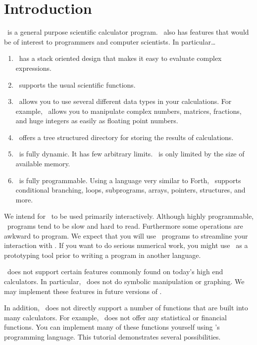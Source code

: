 
\chapter{Introduction}

\CLAC\ is a general purpose scientific calculator program. \CLAC\ also has features that would
be of interest to programmers and computer scientists. In particular\ldots

\begin{enumerate}
  
\item \CLAC\ has a stack oriented design that makes it easy to evaluate complex expressions.
  
\item \CLAC\ supports the usual scientific functions.
  
\item \CLAC\ allows you to use several different data types in your calculations. For example,
  \CLAC\ allows you to manipulate complex numbers, matrices, fractions, and huge integers as
  easily as floating point numbers.
  
\item \CLAC\ offers a tree structured directory for storing the results of calculations.
  
\item \CLAC\ is fully dynamic. It has few arbitrary limits. \CLAC\ is only limited by the size
  of available memory.
  
\item \CLAC\ is fully programmable. Using a language very similar to Forth, \CLAC\ supports
  conditional branching, loops, subprograms, arrays, pointers, structures, and more.

\end{enumerate}

We intend for \CLAC\ to be used primarily interactively. Although highly programmable, \CLAC\
programs tend to be slow and hard to read. Furthermore some operations are awkward to program.
We expect that you will use \CLAC\ programs to streamline your interaction with \CLAC. If you
want to do serious numerical work, you might use \CLAC\ as a prototyping tool prior to writing a
program in another language.

\CLAC\ does not support certain features commonly found on today's high end calculators. In
particular, \CLAC\ does not do symbolic manipulation or graphing. We may implement these
features in future versions of \CLAC.

In addition, \CLAC\ does not directly support a number of functions that are built into many
calculators. For example, \CLAC\ does not offer any statistical or financial functions. You can
implement many of these functions yourself using \CLAC's programming language. This tutorial
demonstrates several possibilities.


